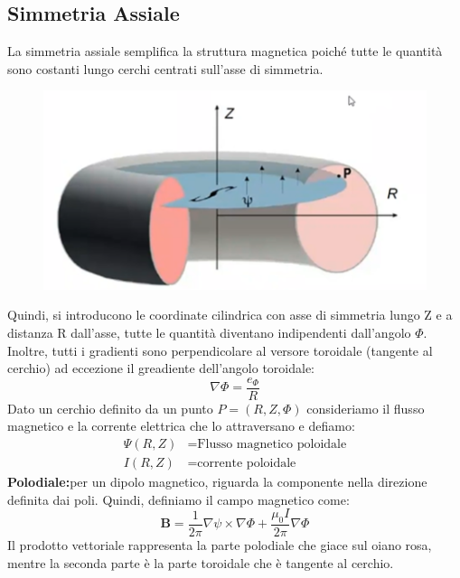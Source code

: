 \documentclass{article}
\begin{document}
\subsection{Simmetria Assiale}
La simmetria assiale semplifica la struttura magnetica poiché tutte le quantità sono costanti lungo cerchi centrati sull'asse di simmetria.
\begin{figure}[h]
	\includegraphics[scale=0.4]{2022-06-26-15-20-02.png}%
\end{figure}
Quindi, si introducono le coordinate cilindrica con asse di simmetria lungo Z e a distanza R dall'asse, tutte le quantità diventano indipendenti dall'angolo \(\Phi \). Inoltre, tutti i gradienti sono perpendicolare al versore toroidale (tangente al cerchio) ad eccezione il greadiente dell'angolo toroidale:\begin{equation*}
	\nabla \Phi = \frac{e_{\Phi }}{R}
\end{equation*}
Dato un cerchio definito da un punto \(P=(R,Z,\Phi )\) consideriamo il flusso magnetico e la corrente elettrica che lo attraversano e defiamo:\begin{align*}
	\Psi(R,Z) & \text{=Flusso magnetico poloidale} \\
	I(R,Z)    & \text{=corrente poloidale}
\end{align*}
\textbf{Polodiale:}per un dipolo magnetico, riguarda la componente nella direzione definita dai poli.
Quindi, definiamo il campo magnetico come:\begin{equation*}
	\mathbf{B}=\frac{1}{2\pi }\nabla\psi\times\nabla\Phi+\frac{\mu_{0}I}{2\pi }\nabla\Phi
\end{equation*}
Il prodotto vettoriale rappresenta la parte polodiale che giace sul oiano rosa, mentre la seconda parte è la parte toroidale che è tangente al cerchio.
\end{document}
